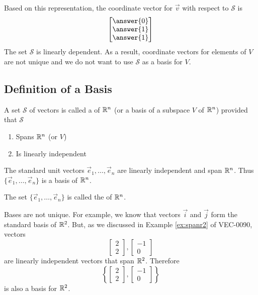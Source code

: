 \documentclass{ximera}
\begin{document}
\begin{example}
\begin{explanation}
Based on this representation, the coordinate vector for $\vec{v}$ with respect to $\mathcal{S}$ is
$$\begin{bmatrix}\answer{0}\\\answer{1}\\\answer{1}\end{bmatrix}$$
The set $\mathcal{S}$ is linearly dependent.  As a result, coordinate vectors for elements of $V$ are not unique and we do not want to use $\mathcal{S}$ as a basis for $V$.
\end{explanation}
\end{example}




\subsection*{Definition of a Basis}

\begin{definition}\label{def:basis}
A set $\mathcal{S}$ of vectors is called a  of $\mathbb{R}^n$ (or a basis of a subspace $V$ of $\mathbb{R}^n$) provided that $\mathcal{S}$
\begin{enumerate}
\item \label{item:defbasis1}
Spans $\mathbb{R}^n$ (or $V$)
\item \label{item:defbasis2}
Is linearly independent
\end{enumerate}
\end{definition}

\begin{example}\label{ex:standardbasis}
The standard unit vectors $\vec{e}_1, \ldots ,\vec{e}_n$ are linearly independent and span $\mathbb{R}^n$.  Thus $\{\vec{e}_1, \ldots ,\vec{e}_n\}$ is a basis of $\mathbb{R}^n$.
\end{example}

\begin{definition}\label{def:standardbasis} The set $\{\vec{e}_1, \ldots ,\vec{e}_n\}$ is called the  of $\mathbb{R}^n$.
\end{definition}

Bases are not unique.  For example, we know that vectors $\vec{i}$ and $\vec{j}$ form the standard basis of $\mathbb{R}^2$.  But, as we discussed in Example \ref{ex:spanr2} of VEC-0090, vectors 
$$\begin{bmatrix}2\\2\end{bmatrix}, \begin{bmatrix}-1\\0\end{bmatrix}$$
are linearly independent vectors that span $\mathbb{R}^2$.  Therefore $$\left\{\begin{bmatrix}2\\2\end{bmatrix}, \begin{bmatrix}-1\\0\end{bmatrix}\right\}$$
is also a basis for $\mathbb{R}^2$.
\end{document}
